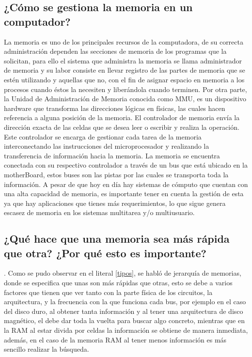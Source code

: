 \documentclass{article}
\begin{document}
\subsection{¿Cómo se gestiona la memoria en un computador?} \label{contenido}
La memoria es uno de los principales recursos de la computadora, de su correcta administración dependen las secciones de memoria de los programas que la solicitan, para ello el sistema que administra la memoria se llama administrador de memoria y su labor consiste en llevar registro de las partes de memoria que se estén utilizando y aquellas que no, con el fin de asignar espacio en memoria a los procesos cuando éstos la necesiten y liberándola cuando terminen. 
Por otra parte, la Unidad de Administración de Memoria conocida como MMU, es un dispositivo hardware que transforma las direcciones lógicas en físicas, las cuales hacen referencia a alguna posición de la memoria. El controlador de memoria envía la dirección exacta de las celdas que se desea leer o escribir y realiza la operación\cite{aragon}. Este controlador se encarga de gestionar cada tarea de la memoria interconectando las instrucciones del microprocesador y realizando la transferencia de información hacia la memoria. La memoria se encuentra conectada con su respectivo controlador a través de un bus que está ubicado en la motherBoard, estos buses son las pistas por las cuales se transporta toda la información.
A pesar de que hoy en día hay sistemas de cómputo que cuentan con una alta capacidad de memoria, es importante tener en cuenta la gestión de esta ya que hay aplicaciones que tienes más requerimientos, lo que sigue genera escasez de memoria en los sistemas multitarea y/o multiusuario.\cite{augusto} \cite{manizales}


\subsection{¿Qué hace que una memoria sea más rápida que otra? ¿Por qué esto es importante?}.\label{comparacion}
Como se pudo observar en el literal \ref{tipos}, se habló de jerarquía de memorias, donde se especifica que unas son más rápidas que otras, esto se debe a varios factores que tienen que ver tanto con la parte física de los circuitos, la arquitectura, y la frecuencia con la que funciona cada bus, por ejemplo en el caso del disco duro, al obtener tanta información y al tener una arquitectura de disco magnético, el debe dar toda la vuelta para buscar algo concreto, mientras que en la RAM al estar divida por celdas la información se obtiene de manera inmediata, además, en el caso de la memoria RAM al tener menos información es más sencillo realizar la búsqueda.\\
\end{document}
